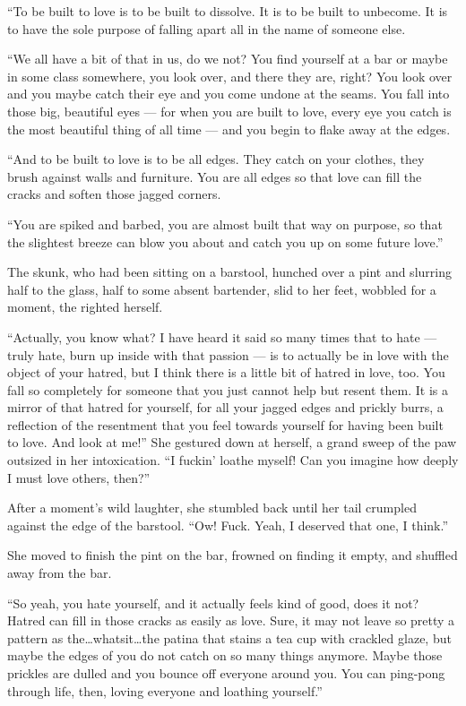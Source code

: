 ``To be built to love is to be built to dissolve. It is to be built to unbecome. It is to have the sole purpose of falling apart all in the name of someone else.

``We all have a bit of that in us, do we not? You find yourself at a bar or maybe in some class somewhere, you look over, and there they are, right? You look over and you maybe catch their eye and you come undone at the seams. You fall into those big, beautiful eyes — for when you are built to love, every eye you catch is the most beautiful thing of all time — and you begin to flake away at the edges.

``And to be built to love is to be all edges. They catch on your clothes, they brush against walls and furniture. You are all edges so that love can fill the cracks and soften those jagged corners.

``You are spiked and barbed, you are almost built that way on purpose, so that the slightest breeze can blow you about and catch you up on some future love.''

The skunk, who had been sitting on a barstool, hunched over a pint and slurring half to the glass, half to some absent bartender, slid to her feet, wobbled for a moment, the righted herself.

``Actually, you know what? I have heard it said so many times that to hate — truly hate, burn up inside with that passion — is to actually be in love with the object of your hatred, but I think there is a little bit of hatred in love, too. You fall so completely for someone that you just cannot help but resent them. It is a mirror of that hatred for yourself, for all your jagged edges and prickly burrs, a reflection of the resentment that you feel towards yourself for having been built to love. And look at me!'' She gestured down at herself, a grand sweep of the paw outsized in her intoxication. ``I fuckin' loathe myself! Can you imagine how deeply I must love others, then?''

After a moment's wild laughter, she stumbled back until her tail crumpled against the edge of the barstool. ``Ow! Fuck. Yeah, I deserved that one, I think.''

She moved to finish the pint on the bar, frowned on finding it empty, and shuffled away from the bar.

``So yeah, you hate yourself, and it actually feels kind of good, does it not? Hatred can fill in those cracks as easily as love. Sure, it may not leave so pretty a pattern as the\ldots whatsit\ldots the patina that stains a tea cup with crackled glaze, but maybe the edges of you do not catch on so many things anymore. Maybe those prickles are dulled and you bounce off everyone around you. You can ping-pong through life, then, loving everyone and loathing yourself.''

